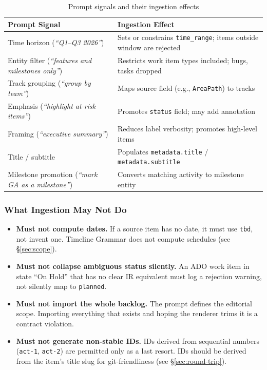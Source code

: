\begin{table}[h]
\centering
\small
\begin{tabular}{lp{9cm}}
\toprule
\textbf{Prompt Signal} & \textbf{Ingestion Effect} \\
\midrule
Time horizon (\textit{``Q1--Q3 2026''}) & Sets or constrains \texttt{time\_range}; items outside window are rejected \\
Entity filter (\textit{``features and milestones only''}) & Restricts work item types included; bugs, tasks dropped \\
Track grouping (\textit{``group by team''}) & Maps source field (e.g., \texttt{AreaPath}) to tracks \\
Emphasis (\textit{``highlight at-risk items''}) & Promotes \texttt{status} field; may add annotation \\
Framing (\textit{``executive summary''}) & Reduces label verbosity; promotes high-level items \\
Title / subtitle & Populates \texttt{metadata.title} / \texttt{metadata.subtitle} \\
Milestone promotion (\textit{``mark GA as a milestone''}) & Converts matching activity to milestone entity \\
\bottomrule
\end{tabular}
\caption{Prompt signals and their ingestion effects}
\label{tab:prompt-controls}
\end{table}

\subsubsection{What Ingestion May Not Do}

\begin{itemize}
  \item \textbf{Must not compute dates.} If a source item has no date, it must use
        \texttt{tbd}, not invent one. Timeline Grammar does not compute schedules
        (see \S\ref{sec:scope}).
  \item \textbf{Must not collapse ambiguous status silently.} An ADO work item in state
        ``On Hold'' that has no clear IR equivalent must log a rejection warning, not
        silently map to \texttt{planned}.
  \item \textbf{Must not import the whole backlog.} The prompt defines the editorial
        scope. Importing everything that exists and hoping the renderer trims it is a
        contract violation.
  \item \textbf{Must not generate non-stable IDs.} IDs derived from sequential numbers
        (\texttt{act-1}, \texttt{act-2}) are permitted only as a last resort. IDs should
        be derived from the item's title slug for git-friendliness (see
        \S\ref{sec:round-trip}).
\end{itemize}


